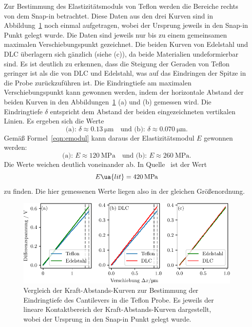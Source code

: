 Zur Bestimmung des Elastizitätsmoduls von Teflon werden die Bereiche rechts von dem Snap-in betrachtet. Diese Daten aus den drei Kurven sind
in Abbildung~\ref{fig: depth} noch einmal aufgetragen, wobei der Ursprung jeweils in den Snap-in Punkt gelegt wurde. Die Daten sind
jeweils nur bis zu einem gemeinsamen maximalen Verschiebungspunkt gezeichnet.
Die beiden Kurven von Edelstahl und DLC überlagern sich gänzlich (siehe (c)), da beide Materialien undeformierbar sind.
Es ist deutlich zu erkennen, dass
die Steigung der Geraden von Teflon geringer ist als die von DLC und Edelstahl, was auf das Eindringen der Spitze in die Probe zurückzuführen ist.
Die Eindringtiefe am maximalen Verschiebungspunkt kann gewonnen werden, indem der horizontale Abstand der beiden Kurven in den Abbildungen~\ref{fig: depth}
(a) und (b) gemessen wird. Die Eindringtiefe $\delta$ entspricht dem Abstand der beiden eingezeichneten vertikalen Linien.
Es ergeben sich die Werte
\begin{equation}
  \text{(a): } \delta \approx \SI{0.13}{\micro\meter} \quad \text{und (b): }\delta \approx \SI{0.070}{\micro\meter}.
\end{equation}
Gemäß Formel~\eqref{eqn:emodul} kann daraus der Elastizitätsmodul $E$ gewonnen werden:
\begin{equation}
  \text{(a): } E \approx \SI{120}{\mega \pascal} \quad \text{und (b): } E \approx \SI{260}{\mega \pascal}.
\end{equation}
Die Werte weichen deutlich voneinander ab.
In Quelle~\cite{emodulteflon} ist der Wert
\begin{equation}
  E\ua{lit} = \SI{420}{\mega \pascal}
\end{equation}
zu finden. Die hier gemessenen Werte liegen also in der gleichen Größenordnung.

\begin{figure}
  \centering
  \includegraphics[scale = 1]{../analysis/data/force_distance/eindringtiefe.pdf}
  \caption{Vergleich der Kraft-Abstands-Kurven zur Bestimmung der Eindringtiefe des Cantilevers in die Teflon Probe.
  Es jeweils der lineare Kontaktbereich der Kraft-Abstands-Kurven dargestellt, wobei der Ursprung in den Snap-in Punkt
  gelegt wurde.}
  \label{fig: depth}
\end{figure}

